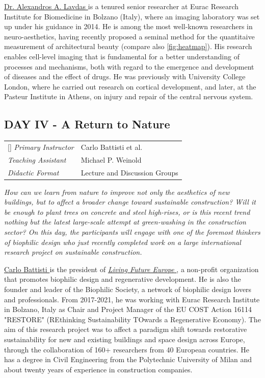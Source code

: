 \documentclass{article}
\begin{document}
\href{https://www.linkedin.com/in/alexandros-a-lavdas-9b127518/}{Dr. Alexandros A. Lavdas \ExternalLink} is a tenured senior researcher at Eurac Research Institute for Biomedicine in Bolzano (Italy), where an imaging laboratory was set up under his guidance in 2014. He is among the most well-known researchers in neuro-aesthetics, having recently proposed a seminal method for the quantitaive measurement of architectural beauty \cite{lavdas_architectural_2022} (compare also \cref{fig:heatmap}). His research enables cell-level imaging that is fundamental for a better understanding of processes and mechanisms, both with regard to the emergence and development of diseases and the effect of drugs. He was previously with University College London, where he carried out research on cortical development, and later, at the Pasteur Institute in Athens, on injury and repair of the central nervous system.

\subsection{DAY IV - A Return to Nature}

\begin{NiceTabular}{W{l}{3cm}l}[]
\textit{Primary Instructor} & Carlo Battisti et al. \\
\textit{Teaching Assistant} & Michael P. Weinold \\
\textit{Didactic Format} & Lecture and Discussion Groups
\end{NiceTabular}

\textit{How can we learn from nature to improve not only the aesthetics of new buildings, but to affect a broader change toward sustainable construction? Will it be enough to plant trees on concrete and steel high-rises, or is this recent trend nothing but the latest large-scale attempt at green-washing in the construction sector? On this day, the participants will engage with one of the foremost thinkers of biophilic design who just recently completed work on a large international research project on sustainable construction.}

\href{https://www.linkedin.com/in/carlobattisti/}{Carlo Battisti \ExternalLink} is the president of \href{https://www.living-future.eu}{\textit{Living Future Europe} \ExternalLink}, a non-profit organization that promotes biophilic design and regenerative development. He is also the founder and leader of the Biophilic Society, a network of biophilic design lovers and professionals. From 2017-2021, he was working with Eurac Research Institute in Bolzano, Italy as Chair and Project Manager of the EU COST Action 16114 "RESTORE" (REthinking Sustainability TOwards a Regenerative Economy). The aim of this research project was to affect a paradigm shift towards restorative sustainability for new and existing buildings and space design across Europe, through the collaboration of 160+ researchers from 40 European countries. He has a degree in Civil Engineering from the Polytechnic University of Milan and about twenty years of experience in construction companies.
\end{document}
